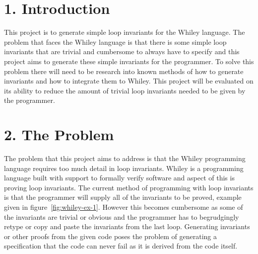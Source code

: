 \documentclass[11pt, a4paper, twoside, openright]{report}
\begin{document}
\section*{1. Introduction}

%
%

This project is to generate simple loop invariants for the Whiley language.
The problem that faces the Whiley language is that there is some simple
loop invariants that are trivial and cumbersome to always have to specify and this project
aims to generate these simple invariants for the programmer.
To solve this problem there will need to be research into known methods
of how to generate invariants and how to integrate them to Whiley.
This project will be evaluated on its ability to reduce the amount of trivial
loop invariants needed to be given by the programmer.


\section*{2. The Problem}



The problem that this project aims to address is that the Whiley programming language
requires too much detail in loop invariants.
Whiley is a programming language built with support to formally verify
software and aspect of this is proving loop invariants.
The current method of programming with loop invariants is that the programmer will supply
all of the invariants to be proved, example given in figure~\ref{fig:whiley-ex-1}.
However this becomes cumbersome as some of the invariants are trivial or obvious
and the programmer has to begrudgingly retype or copy and paste the invariants
from the last loop.
Generating invariants or other proofs from the given code poses the problem
of generating a specification that the code can never fail as it is derived
from the code itself.
\end{document}
